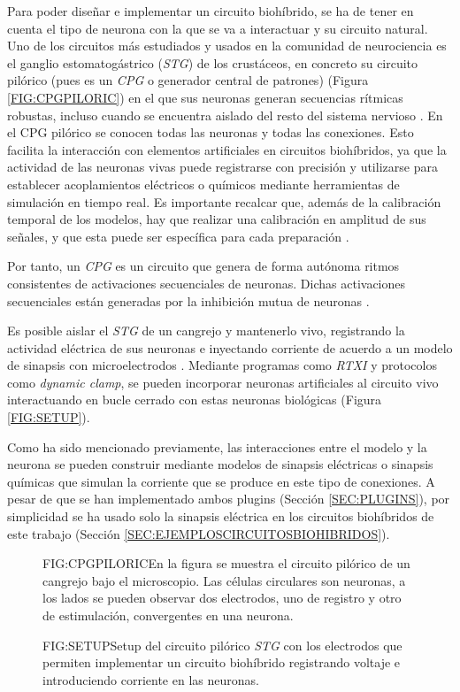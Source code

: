 
Para poder diseñar e implementar un circuito biohíbrido, se ha de tener en cuenta el tipo de neurona con la que se va a interactuar y su circuito natural. Uno de los circuitos más estudiados y usados en la comunidad de neurociencia es el ganglio estomatogástrico (\textit{STG}) de los crustáceos, en concreto su circuito pilórico (pues es un \textit{CPG} o generador central de patrones) (Figura \ref{FIG:CPGPILORIC}) en el que sus neuronas generan secuencias rítmicas robustas, incluso cuando se encuentra aislado del resto del sistema nervioso \cite{Selverston2000, Szcs2000}. En el CPG pilórico se conocen todas las neuronas y todas las conexiones. Esto facilita la interacción con elementos artificiales en circuitos biohíbridos, ya que la actividad de las neuronas vivas puede registrarse con precisión y utilizarse para establecer acoplamientos eléctricos o químicos mediante herramientas de simulación en tiempo real. Es importante recalcar que, además de la calibración temporal de los modelos, hay que realizar una calibración en amplitud de sus señales, y que esta puede ser específica para cada preparación \cite{Reyes-Sanchez2020, ReyesSnchez2023}.

Por tanto, un \textit{CPG} es un circuito que genera de forma autónoma ritmos consistentes de activaciones secuenciales de neuronas. Dichas activaciones secuenciales están generadas por la inhibición mutua de neuronas \cite{Selverston2000, ReyesSnchez2023}.

Es posible aislar el \textit{STG} de un cangrejo y mantenerlo vivo, registrando la actividad eléctrica de sus neuronas e inyectando corriente de acuerdo a un modelo de sinapsis con microelectrodos \cite{Reyes-Sanchez2020}. Mediante programas como \textit{RTXI} y protocolos como \textit{dynamic clamp}, se pueden incorporar neuronas artificiales al circuito vivo interactuando  en bucle cerrado con estas neuronas biológicas \cite{Amaducci2022, Reyes-Sanchez2020} (Figura \ref{FIG:SETUP}).

Como ha sido mencionado previamente, las interacciones entre el modelo y la neurona se pueden construir mediante modelos de sinapsis eléctricas o sinapsis químicas que simulan la corriente que se produce en este tipo de conexiones. A pesar de que se han implementado ambos plugins (Sección \ref{SEC:PLUGINS}), por simplicidad se ha usado solo la sinapsis eléctrica en los circuitos biohíbridos de este trabajo (Sección \ref{SEC:EJEMPLOSCIRCUITOSBIOHIBRIDOS}).

\begin{figure}[CPG pilorico]{FIG:CPGPILORIC}{En la figura se muestra el circuito pilórico de un cangrejo bajo el microscopio. Las células circulares son neuronas, a los lados se pueden observar dos electrodos, uno de registro y otro de estimulación, convergentes en una neurona.}
\end{figure}

\begin{figure}[Setup de electrodos intra y extracelulares]{FIG:SETUP}{Setup del circuito pilórico \textit{STG} con los electrodos que permiten implementar un circuito biohíbrido registrando voltaje e introduciendo corriente en las neuronas.}
\end{figure}


